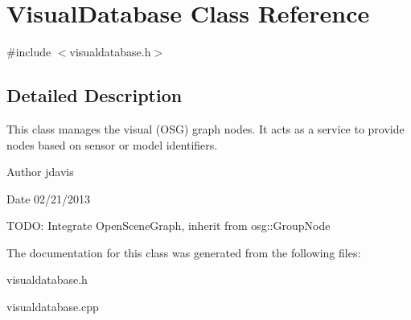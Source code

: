 \hypertarget{classVisualDatabase}{\section{Visual\-Database Class Reference}
\label{classVisualDatabase}
}


{\ttfamily \#include $<$visualdatabase.\-h$>$}



\subsection{Detailed Description}
This class manages the visual (O\-S\-G) graph nodes. It acts as a service to provide nodes based on sensor or model identifiers.

\begin{DoxyAuthor}{Author}
jdavis 
\end{DoxyAuthor}
\begin{DoxyDate}{Date}
02/21/2013
\end{DoxyDate}
T\-O\-D\-O\-: Integrate Open\-Scene\-Graph, inherit from osg\-::\-Group\-Node 

The documentation for this class was generated from the following files\-:\begin{DoxyCompactItemize}
\item 
visualdatabase.\-h\item 
visualdatabase.\-cpp\end{DoxyCompactItemize}
